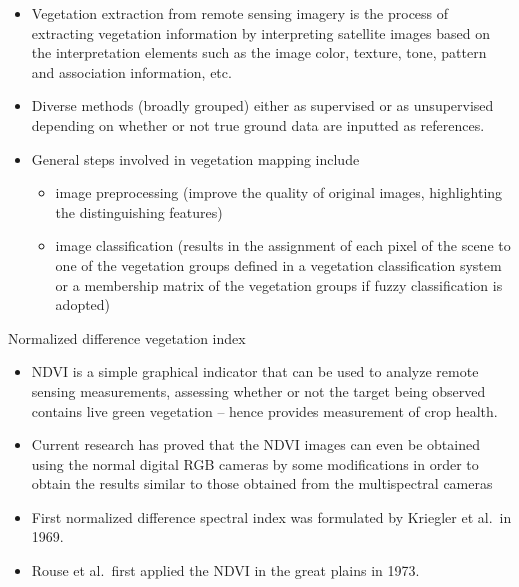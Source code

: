 \documentclass[11pt,dvipsnames,ignorenonframetext,aspectratio=169]{beamer}
\providecommand{\tightlist}{%
  \setlength{\itemsep}{0pt}\setlength{\parskip}{0pt}}
\begin{document}
\begin{frame}{}
\protect\hypertarget{section-6}{}
\begin{itemize}
\tightlist
\item
  Vegetation extraction from remote sensing imagery is the process of
  extracting vegetation information by interpreting satellite images
  based on the interpretation elements such as the image color, texture,
  tone, pattern and association information, etc.
\item
  Diverse methods (broadly grouped) either as supervised or as
  unsupervised depending on whether or not true ground data are inputted
  as references.
\item
  General steps involved in vegetation mapping include

  \begin{itemize}
  \tightlist
  \item
    image preprocessing (improve the quality of original images,
    highlighting the distinguishing features)
  \item
    image classification (results in the assignment of each pixel of the
    scene to one of the vegetation groups defined in a vegetation
    classification system or a membership matrix of the vegetation
    groups if fuzzy classification is adopted)
  \end{itemize}
\end{itemize}
\end{frame}

\begin{frame}{Normalized difference vegetation index}
\protect\hypertarget{normalized-difference-vegetation-index}{}
\begin{itemize}
\tightlist
\item
  NDVI is a simple graphical indicator that can be used to analyze
  remote sensing measurements, assessing whether or not the target being
  observed contains live green vegetation -- hence provides measurement
  of crop health.
\item
  Current research has proved that the NDVI images can even be obtained
  using the normal digital RGB cameras by some modifications in order to
  obtain the results similar to those obtained from the multispectral
  cameras
\item
  First normalized difference spectral index was formulated by Kriegler
  et al.~in 1969.
\item
  Rouse et al.~first applied the NDVI in the great plains in 1973.
\end{itemize}
\end{frame}
\end{document}

